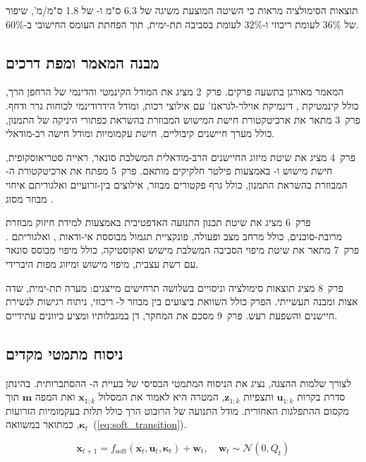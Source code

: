 תוצאות הסימולציה מראות כי השיטה המוצעת משיגה  של 6.3 ס"מ ו- של 1.8 ס"מ/מ', שיפור של 36\% לעומת  ריכוזי ו-32\% לעומת  בסביבה תת-ימית, תוך הפחתת העומס החישובי ב-60\%.

\subsection{מבנה המאמר ומפת דרכים}
\label{sec:intro_structure}

המאמר מאורגן בתשעה פרקים. פרק~2 מציג את המודל הקינמטי והדינמי של הרחפן הרך, כולל קינמטיקת , דינמיקת אוילר-לגראנז' עם אילוצי רכות, ומודל הידרודינמי לכוחות גרר ודחף. פרק~3 מתאר את ארכיטקטורת חישת המישוש המבוזרת בהשראת כפתורי היניקה של התמנון, כולל מערך חיישנים קיבוליים, חישת עקמומיות ומודל חישה רב-מודאלי.

פרק~4 מציג את שיטת מיזוג החיישנים הרב-מודאלית המשלבת סונאר, ראייה סטריאוסקופית, חישת מישוש ו- באמצעות פילטר חלקיקים מותאם. פרק~5 מפתח את ארכיטקטורת ה- המבוזרת בהשראת התמנון, כולל גרף פקטורים מבוזר, אילוצים בין-זרועיים ואלגוריתם איחוי מבוזר מסוג .

פרק~6 מציג את שיטת תכנון התנועה האדפטיבית באמצעות למידת חיזוק מבוזרת מרובת-סוכנים, כולל מרחב מצב ופעולה, פונקציית תגמול מבוססת אי-ודאות , ואלגוריתם . פרק~7 מתאר את שיטת מיפוי הסביבה המשלבת מישוש ואקוסטיקה, כולל מיפוי מבוסס סונאר עם רשת עצבית, מיפוי מישוש ומיזוג מפות היברידי.

פרק~8 מציג תוצאות סימולציה וניסויים בשלושה תרחישים מייצגים: מערה תת-ימית, שדה אצות ומבנה תעשייתי. הפרק כולל השוואת ביצועים בין  מבוזר ל- ריכוזי, ניתוח רגישות לנשירת חיישנים והשפעת רעש. פרק~9 מסכם את המחקר, דן במגבלותיו ומציע כיוונים עתידיים.

\subsection{ניסוח מתמטי מקדים}
\label{sec:intro_math}

לצורך שלמות ההצגה, נציג את הניסוח המתמטי הבסיסי של בעיית ה- ההסתברותית. בהינתן סדרת בקרות $\mathbf{u}_{1:k}$ ותצפיות $\mathbf{z}_{1:k}$, המטרה היא לאמוד את המסלול $\mathbf{x}_{1:k}$ ואת המפה $\mathbf{m}$ תוך מקסום ההתפלגות האחורית. מודל התנועה של הרובוט הרך כולל תלות בעקמומיות הזרועות $\boldsymbol{\kappa}_t$, כמתואר במשוואה~(\ref{eq:soft_transition}).

\begin{equation}
\mathbf{x}_{t+1} = f_{\text{soft}}(\mathbf{x}_t, \mathbf{u}_t, \boldsymbol{\kappa}_t) + \mathbf{w}_t, \quad \mathbf{w}_t \sim \mathcal{N}(0, Q_t)
\label{eq:soft_transition}
\end{equation}

